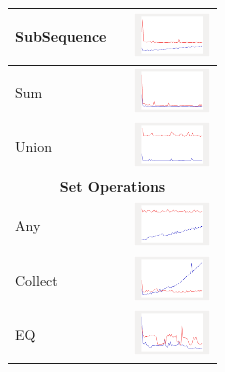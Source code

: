 \begin{longtable}{ m{2.5cm} m{8cm} m{2cm} }
SubSequence &

&
\includegraphics[width=2cm]{../graphs/sequence/small/SubSequence}
\\\hline

Sum &

&
\includegraphics[width=2cm]{../graphs/sequence/small/Sum}
\\\hline

Union &

&
\includegraphics[width=2cm]{../graphs/sequence/small/Union}
\\\hline
 \multicolumn{3}{c}{{\bf Set Operations}}\\\hline
 
  Any &
  
  & 
  	\includegraphics[width=2cm]{../graphs/set/small/Any}
  \\\hline
  
  Collect &

&
\includegraphics[width=2cm]{../graphs/set/small/Collect}
\\\hline

EQ &

&
\includegraphics[width=2cm]{../graphs/set/small/EQ}
\\\hline


\end{longtable}
